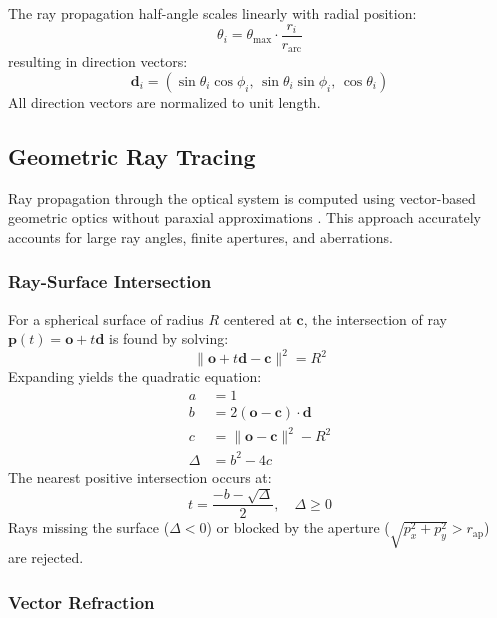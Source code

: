 The ray propagation half-angle scales linearly with radial position:
\begin{equation}
\theta_i = \theta_{\max} \cdot \frac{r_i}{r_{\text{arc}}}
\end{equation}
resulting in direction vectors:
\begin{equation}
\mathbf{d}_i = (\sin\theta_i \cos\phi_i, \, \sin\theta_i \sin\phi_i, \, \cos\theta_i)
\end{equation}
All direction vectors are normalized to unit length.

\subsection{Geometric Ray Tracing}

Ray propagation through the optical system is computed using vector-based geometric optics without paraxial approximations \cite{glassner1989}. This approach accurately accounts for large ray angles, finite apertures, and aberrations.

\subsubsection{Ray-Surface Intersection}

For a spherical surface of radius $R$ centered at $\mathbf{c}$, the intersection of ray $\mathbf{p}(t) = \mathbf{o} + t\mathbf{d}$ is found by solving:
\begin{equation}
\|\mathbf{o} + t\mathbf{d} - \mathbf{c}\|^2 = R^2
\end{equation}
Expanding yields the quadratic equation:
\begin{align}
a &= 1 \\
b &= 2(\mathbf{o} - \mathbf{c}) \cdot \mathbf{d} \\
c &= \|\mathbf{o} - \mathbf{c}\|^2 - R^2 \\
\Delta &= b^2 - 4c
\end{align}
The nearest positive intersection occurs at:
\begin{equation}
t = \frac{-b - \sqrt{\Delta}}{2}, \quad \Delta \geq 0
\end{equation}
Rays missing the surface ($\Delta < 0$) or blocked by the aperture ($\sqrt{p_x^2 + p_y^2} > r_{\text{ap}}$) are rejected.

\subsubsection{Vector Refraction}

